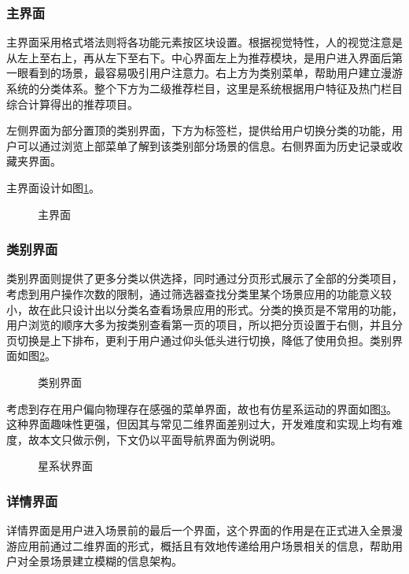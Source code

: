 \subsubsection{主界面}
主界面采用格式塔法则将各功能元素按区块设置。根据视觉特性，人的视觉注意是从左上至右上，再从左下至右下。中心界面左上为推荐模块，是用户进入界面后第一眼看到的场景，最容易吸引用户注意力。右上方为类别菜单，帮助用户建立漫游系统的分类体系。整个下方为二级推荐栏目，这里是系统根据用户特征及热门栏目综合计算得出的推荐项目。

左侧界面为部分置顶的类别界面，下方为标签栏，提供给用户切换分类的功能，用户可以通过浏览上部菜单了解到该类别部分场景的信息。右侧界面为历史记录或收藏夹界面。

主界面设计如图\ref{fig:d-01}。

\begin{figure}[htp]
\centering
{}
\caption{主界面}
\label{fig:d-01}
\end{figure}

\subsubsection{类别界面}
类别界面则提供了更多分类以供选择，同时通过分页形式展示了全部的分类项目，考虑到用户操作次数的限制，通过筛选器查找分类里某个场景应用的功能意义较小，故在此只设计出以分类名查看场景应用的形式。分类的换页是不常用的功能，用户浏览的顺序大多为按类别查看第一页的项目，所以把分页设置于右侧，并且分页切换是上下排布，更利于用户通过仰头低头进行切换，降低了使用负担。类别界面如图\ref{fig:d-06}。

\begin{figure}[htp]
\centering
{}
\caption{类别界面}
\label{fig:d-06}
\end{figure}

考虑到存在用户偏向物理存在感强的菜单界面，故也有仿星系运动的界面如图\ref{fig:d-02}。这种界面趣味性更强，但因其与常见二维界面差别过大，开发难度和实现上均有难度，故本文只做示例，下文仍以平面导航界面为例说明。

\begin{figure}[htp]
\centering
{}
\caption{星系状界面}
\label{fig:d-02}
\end{figure}

\subsubsection{详情界面}
详情界面是用户进入场景前的最后一个界面，这个界面的作用是在正式进入全景漫游应用前通过二维界面的形式，概括且有效地传递给用户场景相关的信息，帮助用户对全景场景建立模糊的信息架构。

